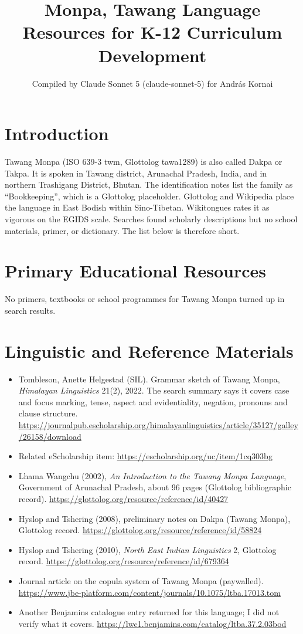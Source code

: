 \documentclass[12pt]{article}
\title{Monpa, Tawang Language Resources for K-12 Curriculum Development}
\author{Compiled by Claude Sonnet 5 (claude-sonnet-5) for Andr\'as Kornai}
\date{}
\begin{document}
\maketitle

\section{Introduction}
Tawang Monpa (ISO 639-3 twm, Glottolog tawa1289) is also called Dakpa or Takpa. It is spoken in Tawang district, Arunachal Pradesh, India, and in northern Trashigang District, Bhutan. The identification notes list the family as ``Bookkeeping'', which is a Glottolog placeholder. Glottolog and Wikipedia place the language in East Bodish within Sino-Tibetan. Wikitongues rates it as vigorous on the EGIDS scale. Searches found scholarly descriptions but no school materials, primer, or dictionary. The list below is therefore short.

\section{Primary Educational Resources}
No primers, textbooks or school programmes for Tawang Monpa turned up in search results.

\section{Linguistic and Reference Materials}
\begin{itemize}
\item Tombleson, Anette Helgestad (SIL). Grammar sketch of Tawang Monpa, \emph{Himalayan Linguistics} 21(2), 2022. The search summary says it covers case and focus marking, tense, aspect and evidentiality, negation, pronouns and clause structure. \url{https://journalpub.escholarship.org/himalayanlinguistics/article/35127/galley/26158/download}
\item Related eScholarship item: \url{https://escholarship.org/uc/item/1cq303bg}
\item Lhama Wangchu (2002), \emph{An Introduction to the Tawang Monpa Language}, Government of Arunachal Pradesh, about 96 pages (Glottolog bibliographic record). \url{https://glottolog.org/resource/reference/id/40427}
\item Hyslop and Tshering (2008), preliminary notes on Dakpa (Tawang Monpa), Glottolog record. \url{https://glottolog.org/resource/reference/id/58824}
\item Hyslop and Tshering (2010), \emph{North East Indian Linguistics} 2, Glottolog record. \url{https://glottolog.org/resource/reference/id/679364}
\item Journal article on the copula system of Tawang Monpa (paywalled). \url{https://www.jbe-platform.com/content/journals/10.1075/ltba.17013.tom}
\item Another Benjamins catalogue entry returned for this language; I did not verify what it covers. \url{https://lwc1.benjamins.com/catalog/ltba.37.2.03bod}
\end{itemize}
\end{document}
